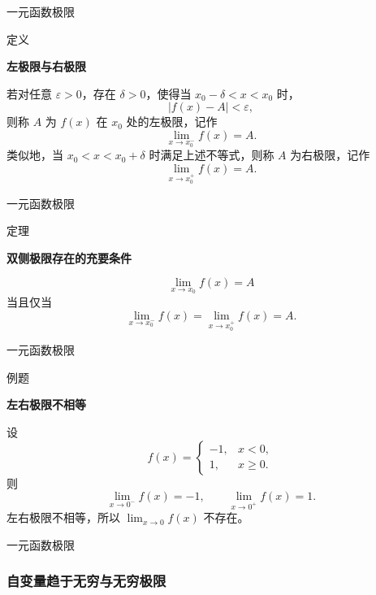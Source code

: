 \documentclass[aspectratio=169,10pt,fontset=fandol]{ctexbeamer}
\begin{document}
\begin{frame}[t,fragile]{一元函数极限}
\footnotesize
\begin{block}{定义}
{\footnotesize
\textbf{左极限与右极限}\par

若对任意 \(\varepsilon>0\)，存在 \(\delta>0\)，使得当 \(x_0-\delta<x<x_0\) 时，
\[
|f(x)-A|<\varepsilon,
\]
则称 \(A\) 为 \(f(x)\) 在 \(x_0\) 处的左极限，记作
\[
\lim_{x\to x_0^-}f(x)=A.
\]
类似地，当 \(x_0<x<x_0+\delta\) 时满足上述不等式，则称 \(A\) 为右极限，记作
\[
\lim_{x\to x_0^+}f(x)=A.
\]

}
\end{block}
\end{frame}
\begin{frame}[t,fragile]{一元函数极限}
\footnotesize
\begin{block}{定理}
{\footnotesize
\textbf{双侧极限存在的充要条件}\par

\[
\lim_{x\to x_0}f(x)=A
\]
当且仅当
\[
\lim_{x\to x_0^-}f(x)=\lim_{x\to x_0^+}f(x)=A.
\]

}
\end{block}
\end{frame}
\begin{frame}[t,fragile]{一元函数极限}
\footnotesize
\begin{block}{例题}
{\footnotesize
\textbf{左右极限不相等}\par

设
\[
f(x)=
\begin{cases}
-1,&x<0,\\
1,&x\geq0.
\end{cases}
\]
则
\[
\lim_{x\to0^-}f(x)=-1,\qquad
\lim_{x\to0^+}f(x)=1.
\]
左右极限不相等，所以 \(\lim_{x\to0}f(x)\) 不存在。

}
\end{block}
\end{frame}
\begin{frame}[t,fragile]{一元函数极限}
\footnotesize
{\footnotesize
\subsubsection*{自变量趋于无穷与无穷极限}


}
\end{frame}
\end{document}
